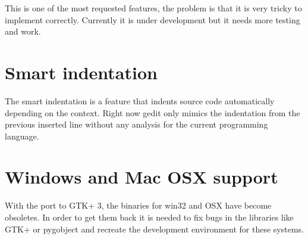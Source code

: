 This is one of the most requested features, the problem is that it is very tricky to implement correctly. Currently it is under development but it needs more testing and work.

\section{Smart indentation}

The smart indentation is a feature that indents source code automatically depending on the context. Right now gedit only mimics the indentation from the previous inserted line without any analysis for the current programming language.

\section{Windows and Mac OSX support}

With the port to GTK+ 3, the binaries for win32 and OSX have become obsoletes. In order to get them back it is needed to fix bugs in the libraries like GTK+ or pygobject and recreate the development environment for these systems.
